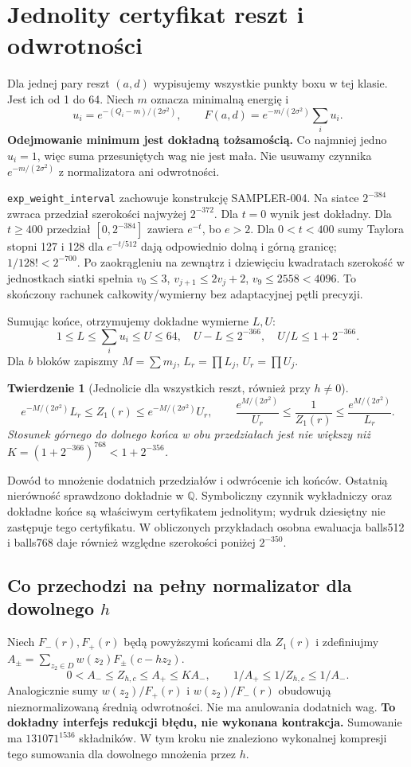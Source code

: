 \documentclass[11pt,a4paper]{article}
\newcommand{\code}[1]{\nolinkurl{#1}}
\newtheorem{theorem}{Twierdzenie}
\begin{document}
\section{Jednolity certyfikat reszt i odwrotności}
Dla jednej pary reszt $(a,d)$ wypisujemy wszystkie punkty boxu w tej klasie.
Jest ich od 1 do 64. Niech $m$ oznacza minimalną energię i
\[
 u_i=e^{-(Q_i-m)/(2\sigma^2)},\qquad
 F(a,d)=e^{-m/(2\sigma^2)}\sum_i u_i.
\]
\textbf{Odejmowanie minimum jest dokładną tożsamością.}
Co najmniej jedno $u_i=1$, więc suma przesuniętych wag nie jest mała.
Nie usuwamy czynnika $e^{-m/(2\sigma^2)}$ z normalizatora ani odwrotności.

\code{exp_weight_interval} zachowuje konstrukcję SAMPLER-004.
Na siatce $2^{-384}$ zwraca przedział szerokości najwyżej $2^{-372}$.
Dla $t=0$ wynik jest dokładny. Dla $t\ge400$ przedział $[0,2^{-384}]$
zawiera $e^{-t}$, bo $e>2$. Dla $0<t<400$ sumy Taylora stopni 127 i 128
dla $e^{-t/512}$ dają odpowiednio dolną i górną granicę;
$1/128!<2^{-700}$. Po zaokrągleniu na zewnątrz i dziewięciu kwadratach
szerokość w jednostkach siatki spełnia
$v_0\le3$, $v_{j+1}\le2v_j+2$, $v_9\le2558<4096$.
To skończony rachunek całkowity/wymierny bez adaptacyjnej pętli precyzji.

Sumując końce, otrzymujemy dokładne wymierne $L,U$:
\[
 1\le L\le\sum_i u_i\le U\le64,\quad U-L\le2^{-366},\quad
 U/L\le1+2^{-366}.
\]
Dla $b$ bloków zapiszmy $M=\sum m_j$, $L_r=\prod L_j$, $U_r=\prod U_j$.
\begin{theorem}[Jednolicie dla wszystkich reszt, również przy $h\ne0$]
\[
 e^{-M/(2\sigma^2)}L_r\le Z_1(r)\le e^{-M/(2\sigma^2)}U_r,
 \qquad
 \frac{e^{M/(2\sigma^2)}}{U_r}\le\frac1{Z_1(r)}
 \le\frac{e^{M/(2\sigma^2)}}{L_r}.
\]
Stosunek górnego do dolnego końca w obu przedziałach jest nie większy niż
$K=(1+2^{-366})^{768}<1+2^{-356}$.
\end{theorem}
Dowód to mnożenie dodatnich przedziałów i odwrócenie ich końców.
Ostatnią nierówność sprawdzono dokładnie w $\mathbb Q$.
Symboliczny czynnik wykładniczy oraz dokładne końce są właściwym
certyfikatem jednolitym; wydruk dziesiętny nie zastępuje tego certyfikatu.
W obliczonych przykładach osobna ewaluacja balls512 i balls768 daje
również względne szerokości poniżej $2^{-350}$.

\subsection*{Co przechodzi na pełny normalizator dla dowolnego $h$}
Niech $F_-(r),F_+(r)$ będą powyższymi końcami dla $Z_1(r)$ i zdefiniujmy
$A_\pm=\sum_{z_2\in D}w(z_2)F_\pm(c-hz_2)$.
\[
 0<A_-\le Z_{h,c}\le A_+\le KA_-,\qquad
 1/A_+\le1/Z_{h,c}\le1/A_-.
\]
Analogicznie sumy $w(z_2)/F_+(r)$ i $w(z_2)/F_-(r)$ obudowują
nieznormalizowaną średnią odwrotności. Nie ma anulowania dodatnich wag.
\textbf{To dokładny interfejs redukcji błędu, nie wykonana kontrakcja.}
Sumowanie ma $131071^{1536}$ składników. W tym kroku nie znaleziono
wykonalnej kompresji tego sumowania dla dowolnego mnożenia przez $h$.
\end{document}
